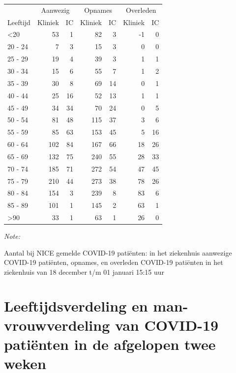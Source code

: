 \documentclass[
  english,
  man,floatsintext]{apa6}
\begin{document}
\begin{table}
\centering\begingroup\fontsize{10}{12}\selectfont

\begin{threeparttable}
\begin{tabular}{lrrrrrr}
\toprule
\multicolumn{1}{c}{ } & \multicolumn{2}{c}{Aanwezig} & \multicolumn{2}{c}{Opnames} & \multicolumn{2}{c}{Overleden} \\
\cmidrule(l{3pt}r{3pt}){2-3} \cmidrule(l{3pt}r{3pt}){4-5} \cmidrule(l{3pt}r{3pt}){6-7}
Leeftijd & Kliniek & IC & Kliniek & IC & Kliniek & IC\\
\midrule
<20 & 53 & 1 & 82 & 3 & -1 & 0\\
20 - 24 & 7 & 3 & 15 & 3 & 0 & 0\\
25 - 29 & 19 & 4 & 39 & 3 & 1 & 1\\
30 - 34 & 15 & 6 & 55 & 7 & 1 & 2\\
35 - 39 & 30 & 8 & 69 & 14 & 0 & 1\\
40 - 44 & 25 & 16 & 52 & 13 & 1 & 1\\
45 - 49 & 34 & 34 & 70 & 24 & 0 & 5\\
50 - 54 & 81 & 48 & 115 & 37 & 3 & 6\\
55 - 59 & 85 & 63 & 153 & 45 & 5 & 16\\
60 - 64 & 102 & 84 & 167 & 66 & 18 & 26\\
65 - 69 & 132 & 75 & 240 & 55 & 28 & 33\\
70 - 74 & 185 & 71 & 272 & 54 & 47 & 45\\
75 - 79 & 210 & 44 & 273 & 38 & 78 & 26\\
80 - 84 & 154 & 3 & 239 & 8 & 83 & 6\\
85 - 89 & 101 & 1 & 145 & 2 & 63 & 1\\
>90 & 33 & 1 & 63 & 1 & 26 & 0\\
\bottomrule
\end{tabular}
\begin{tablenotes}
\item \textit{Note: } 
\item Aantal bij NICE gemelde COVID-19 patiënten: in het ziekenhuis aanwezige COVID-19 patiënten, opnames, en overleden COVID-19 patiënten in het ziekenhuis van 18 december t/m 01 januari 15:15 uur
\end{tablenotes}
\end{threeparttable}
\endgroup{}
\end{table}

\newpage

\hypertarget{leeftijdsverdeling-en-man-vrouwverdeling-van-covid-19-patiuxebnten-in-de-afgelopen-twee-weken}{%
\section{Leeftijdsverdeling en man-vrouwverdeling van COVID-19 patiënten in de afgelopen twee weken}\label{leeftijdsverdeling-en-man-vrouwverdeling-van-covid-19-patiuxebnten-in-de-afgelopen-twee-weken}}
\end{document}
